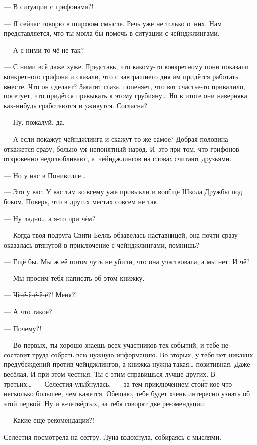 \documentclass[fontsize=11pt,a5paper,titlepage=firstcover]{scrbook}
\begin{document}
--- В ситуации с грифонами?!

--- Я сейчас говорю в широком смысле. Речь уже не только о~них. Нам представляется, что ты могла бы помочь в ситуации с чейнджлингами.

--- А с ними-то чё не так?

--- С ними всё даже хуже. Представь, что какому-то конкретному пони показали конкретного грифона и сказали, что с завтрашнего дня им придётся работать вместе. Что он сделает? Закатит глаза, попеняет, что вот счастье-то привалило, посетует, что придётся привыкать к этому грубияну{\ldots} Но в итоге они наверняка как-нибудь сработаются и уживутся. Согласна?

--- Ну, пожалуй, да.

--- А если покажут чейнджлинга и скажут то же самое? Добрая половина откажется сразу, больно уж непонятный народ. И~это при том, что грифонов откровенно недолюбливают, а~чейнджлингов на словах считают друзьями.

--- Но у нас в Понивилле{\ldots}

--- Это у вас. У вас там ко всему уже привыкли и вообще Школа Дружбы под боком. Поверь, что в других местах совсем не так.

--- Ну ладно{\ldots} а я-то при чём?

--- Когда твоя подруга Свити Белль обзавелась наставницей, она почти сразу оказалась втянутой в приключение с чейнджлингами, помнишь?

--- Ещё бы. Мы ж её потом чуть не убили, что она участвовала, а мы нет. И чё?

--- Мы просим тебя написать об этом книжку.

--- Чё-ё-ё-ё-ё-ё?! Меня?!

--- А что такое?

--- Почему?!

--- Во-первых, ты хорошо знаешь всех участников тех событий, и тебе не составит труда собрать всю нужную информацию. Во-вторых, у тебя нет никаких предубеждений против чейнджлингов, а книжка нужна такая{\ldots} позитивная. Даже весёлая. И при этом честная. Ты с этим справишься лучше других. В-третьих{\ldots}~--- Селестия улыбнулась,~--- за тем приключением стои́т кое-что несколько большее, чем кажется. Обещаю, тебе будет очень интересно узнать об этой первой. Ну и в-четвёртых, за тебя говорят две рекомендации.

--- Какие ещё рекомендации?!

Селестия посмотрела на сестру. Луна вздохнула, собираясь с мыслями.
\end{document}
